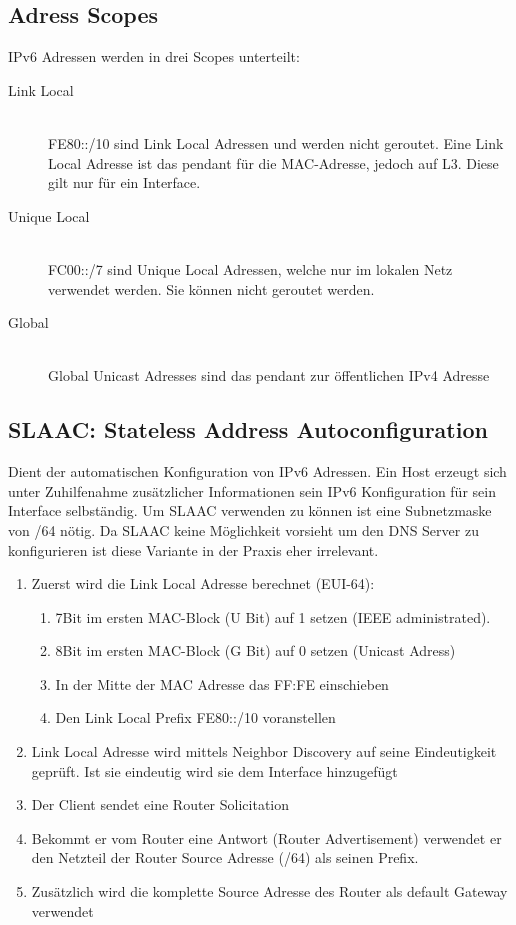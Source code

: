 \subsection{Adress Scopes}
IPv6 Adressen werden in drei Scopes unterteilt:
\begin{description}
	\item[Link Local] \hfill \\ 
	FE80::/10 sind Link Local Adressen und werden nicht geroutet. Eine Link Local Adresse ist das pendant für die MAC-Adresse, jedoch auf L3. Diese gilt nur für  ein Interface.
	\item[Unique Local] \hfill \\
	FC00::/7 sind Unique Local Adressen, welche nur im lokalen Netz verwendet werden. Sie können nicht geroutet werden.
	\item[Global] \hfill \\
	Global Unicast Adresses sind das pendant zur öffentlichen IPv4 Adresse
\end{description}

\subsection{SLAAC: Stateless Address Autoconfiguration}
Dient der automatischen Konfiguration von IPv6 Adressen. Ein Host erzeugt sich unter Zuhilfenahme zusätzlicher Informationen sein IPv6 Konfiguration für sein Interface selbständig. Um SLAAC verwenden zu können ist eine Subnetzmaske von /64 nötig. Da SLAAC keine Möglichkeit vorsieht um den DNS Server zu konfigurieren ist diese Variante in der Praxis eher irrelevant.

\begin{enumerate}
	\item Zuerst wird die Link Local Adresse berechnet (EUI-64): 
	\begin{enumerate}
		\item 7Bit im ersten MAC-Block (U Bit) auf 1 setzen (IEEE administrated). 
		\item 8Bit im ersten MAC-Block (G Bit) auf 0 setzen (Unicast Adress)
		\item In der Mitte der MAC Adresse das FF:FE einschieben
		\item Den Link Local Prefix FE80::/10 voranstellen
	\end{enumerate}
	\item Link Local Adresse wird mittels Neighbor Discovery auf seine Eindeutigkeit geprüft. Ist sie eindeutig wird sie dem Interface hinzugefügt
	\item Der Client sendet eine Router Solicitation 
	\item Bekommt er vom Router eine Antwort (Router Advertisement) verwendet er den Netzteil der Router Source Adresse (/64) als seinen Prefix.
	\item Zusätzlich wird die komplette Source Adresse des Router als default Gateway verwendet
\end{enumerate}

